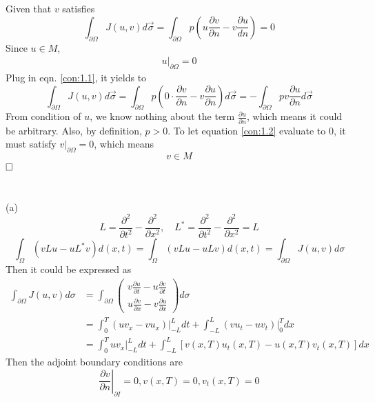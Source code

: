 \documentclass{article}
\newcommand{\qedhere}{$\hfill\ensuremath{\square}$}
\begin{document}
\section{}
Given that $v$ satisfies
\begin{equation}
	\int_{\partial \Omega} J(u,v) d \vec{\sigma} = \int_{\partial \Omega}p (u \frac{\partial v}{\partial n}- v \frac{\partial u}{dn}) = 0 \label{con:1.1}
\end{equation}
Since $u \in M$,
\begin{align*}
	u|_{\partial \Omega} = 0
\end{align*}
Plug in eqn. \eqref{con:1.1}, it yields to
\begin{equation}
	\int_{\partial \Omega} J(u,v) d \vec{\sigma} = \int_{\partial \Omega}p (0 \cdot  \frac{\partial v}{\partial n}- v \frac{\partial u}{\partial n}) d \vec{\sigma}= - \int_{\partial \Omega}p  v \frac{\partial u}{\partial n} d \vec{\sigma}\label{con:1.2} 
\end{equation}
From condition of $u$, we know nothing about the term $\frac{\partial u}{\partial n}$, which means it could be arbitrary. Also, by definition, $p>0$. To let equation \eqref{con:1.2} evaluate to 0, it must satisfy $v|_{\partial \Omega}=0$, which means
\[
 	v \in M
 \] 
 \qedhere
\section{}
\subsection{}
(a)
$$L = \frac { \partial ^ { 2 } } { \partial t ^ { 2 } } - \frac { \partial ^ { 2 } } { \partial x ^ { 2 } },
\quad  L ^ { * } = \frac { \partial ^ { 2 } } { \partial t ^ { 2 } } - \frac { \partial ^ { 2 } } { \partial x ^ { 2 } }=L
$$
$$\int _ { \Omega } \left( v L u - u L ^ { * } v \right) d ( x , t ) = \int _ { \Omega } ( v L u - u L v ) d ( x , t )= \int _ { \partial \Omega } J ( u , v ) d \sigma $$
Then it could be expressed as 
\begin{align*}
\int_{\partial \Omega} J(u, v) d \sigma &=\int_{\partial \Omega} \left( \begin{array}{c}{v \frac{\partial u}{\partial t}-u \frac{\partial v}{\partial t}} \\ {u \frac{\partial v}{\partial x}-v \frac{\partial u}{\partial x}}\end{array}\right) d \sigma \\
 &=\int_{0}^{T}\left.\left(u v_{x}-v u_{x}\right)\right|_{-L} ^{L} d t+\int_{-L}^{L}\left.\left(v u_{t}-u v_{t}\right)\right|_{0} ^{T} d x 
 \\ &=\int_{0}^{T} u\left.v_{x}\right|_{-L} ^{L} d t+\int_{-L}^{L}\left[v(x, T) u_{t}(x, T)-u(x, T) v_{t}(x, T)\right] d x
\end{align*}
Then the adjoint boundary conditions are
$$\left. \frac { \partial v } { \partial n } \right| _ { \partial I } = 0, v ( x , T ) = 0 , v _ { t } ( x , T ) = 0 $$
\end{document}
